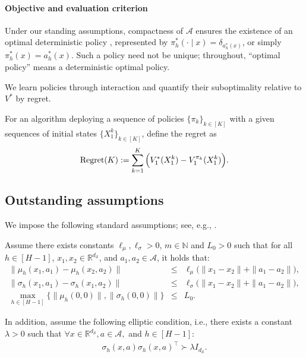 \documentclass[final,supplement]{siamart251216}
\begin{document}
\paragraph{Objective and evaluation criterion}
Under our standing assumptions, compactness of $\mathcal A$ ensures the
existence of an optimal deterministic policy \cite{puterman2014markov},
represented by $\pi_h^*(\cdot\mid x)=\delta_{a_h^*(x)}$, or simply
$\pi_h^*(x)=a_h^*(x)$. Such a policy need not be unique; throughout,
``optimal policy'' means a deterministic optimal policy.

We learn policies through interaction and quantify their suboptimality relative to $V^*$ by regret.
\begin{definition}
For an algorithm  deploying a sequence of  policies $\{\pi_{k}\}_{k\in[K]}$ with a given sequences of initial states $\{X_1^k\}_{k\in[K]}$, define the regret as
\begin{eqnarray*}
    {\rm Regret}(K):=\sum_{k=1}^K \Big(V_1^*(X_1^k)-V_1^{\pi_{k}}(X_1^k)\Big).
\end{eqnarray*}
\end{definition}



\subsection{Outstanding assumptions}
\label{sec:assumptions}

We impose the following standard assumptions; see, e.g.,
\cite{yong1999stochastic,bubeck2011x}.


\begin{assumption}\label{ass:lipschitz}
Assume there exists constants $\ell_{\mu},\ell_{\sigma}>0$,  $m\in \mathbb{N}$ and $L_{0}> 0$ such that for all $h\in [H-1]$, $x_1,x_2 \in \mathbb{R}^{d_{\mathcal{S}}}$, and $a_1,a_2\in \mathcal{A}$, it holds that:
    \begin{eqnarray*}
        \|\mu_h(x_1,a_1)-\mu_h(x_2,a_2)\|&\leq&\ell_{\mu}\Big(\|x_1-x_2\|+\|a_1-a_2\|\Big),\nonumber\\
        \|\sigma_h(x_1,a_1)-\sigma_h(x_1,a_2)\|&\leq& \ell_{\sigma}\Big(\|x_1-x_2\|+\|a_1-a_2\|\Big),\nonumber\\
          \max_{h\in[H-1]}\{\|\mu_{h}(0,0)\|,\|\sigma_{h}(0,0)\|\}&\leq& L_{0}. 
    \end{eqnarray*} 

In addition, assume the following elliptic condition, i.e., there exists a  constant $\lambda>0$ such that $\forall x \in \mathbb{R}^{d_{\mathcal{S}}}, a \in \mathcal{A},$ and $  h \in [H-1]$:
\begin{eqnarray}\label{ass-eqn:volatility}
    \sigma_{h}(x,a)\sigma_{h}(x,a)^{\top}\succ \lambda I_{d_{\mathcal{S}}}.
\end{eqnarray}
\end{assumption}
\end{document}
